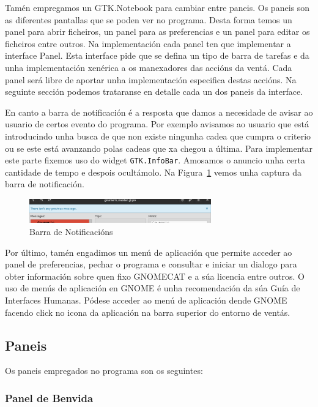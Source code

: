 Tamén empregamos un GTK.Notebook para cambiar entre paneis. Os paneis son as diferentes pantallas que se poden ver no programa. Desta forma temos un panel para abrir ficheiros, un panel para as preferencias e un panel para editar os ficheiros entre outros. Na implementación cada panel ten que implementar a interface Panel. Esta interface pide que se defina un tipo de barra de tarefas e da unha implementación xenérica a os manexadores das accións da ventá. Cada panel será libre de aportar unha implementación especifica destas accións. Na seguinte sección podemos trataranse en detalle cada un dos paneis da interface.

En canto a barra de notificación é a resposta que damos a necesidade de avisar ao usuario de certos evento do programa. Por exemplo avisamos ao usuario que está introducindo unha busca de que non existe ningunha cadea que cumpra o criterio ou se este está avanzando polas cadeas que xa chegou a última. Para implementar este parte fixemos uso do widget \lstinline{GTK.InfoBar}. Amosamos o anuncio unha certa cantidade de tempo e despois ocultámolo. Na Figura~\ref{fig:ui:v3:infobar} vemos unha captura da barra de notificación.

\begin{figure}[h!]
  \centering
    \includegraphics[width=0.7\textwidth]{img/gsoc2_it3_ui.png}
    \caption{Barra de Notificacións}
    \label{fig:ui:v3:infobar}
\end{figure}

Por último, tamén engadimos un menú de aplicación que permite acceder ao panel de preferencias, pechar o programa e consultar e iniciar un dialogo para obter información sobre quen fixo GNOMECAT e a súa licencia entre outros. O uso de menús de aplicación en GNOME é unha recomendación da súa Guía de Interfaces Humanas. Pódese acceder ao menú de aplicación dende GNOME facendo click no icona da aplicación na barra superior do entorno de ventás.

\subsection{Paneis}
Os paneis empregados no programa son os seguintes:

\subsubsection{Panel de Benvida}


